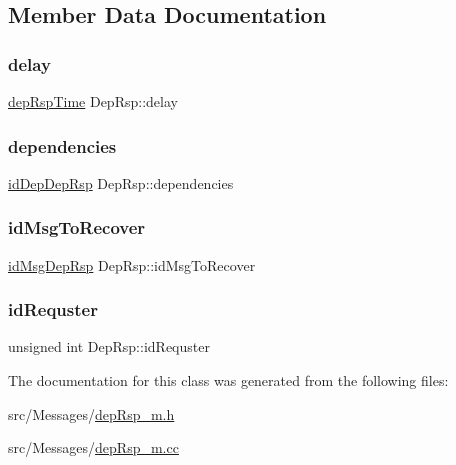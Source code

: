 \subsection{Member Data Documentation}
\mbox{\label{class_dep_rsp_a9b383b175e0b581e1558b2dc34a21b7a}} 
\subsubsection{\texorpdfstring{delay}{delay}}
{\footnotesize\ttfamily \hyperlink{dep_rsp__m_8h_ab118b8474723cf26f98151aae3d55940}{dep\+Rsp\+Time} Dep\+Rsp\+::delay\hspace{0.3cm}{\ttfamily [protected]}}

\mbox{\label{class_dep_rsp_a0881ee52098e202a4486da80efa6ce1f}} 
\subsubsection{\texorpdfstring{dependencies}{dependencies}}
{\footnotesize\ttfamily \hyperlink{dep_rsp__m_8h_a3c2ceb107008eb344443aaab2eb872b8}{id\+Dep\+Dep\+Rsp} Dep\+Rsp\+::dependencies\hspace{0.3cm}{\ttfamily [protected]}}

\mbox{\label{class_dep_rsp_a7b777428e859ba7a6f083e13f6431cf4}} 
\subsubsection{\texorpdfstring{id\+Msg\+To\+Recover}{idMsgToRecover}}
{\footnotesize\ttfamily \hyperlink{dep_rsp__m_8h_a8a41011e0821f196429cd4bc45638bcf}{id\+Msg\+Dep\+Rsp} Dep\+Rsp\+::id\+Msg\+To\+Recover\hspace{0.3cm}{\ttfamily [protected]}}

\mbox{\label{class_dep_rsp_ae8c6f097db47049e4cb84e6788f9d58d}} 
\subsubsection{\texorpdfstring{id\+Requster}{idRequster}}
{\footnotesize\ttfamily unsigned int Dep\+Rsp\+::id\+Requster\hspace{0.3cm}{\ttfamily [protected]}}



The documentation for this class was generated from the following files\+:\begin{DoxyCompactItemize}
\item 
src/\+Messages/\hyperlink{dep_rsp__m_8h}{dep\+Rsp\+\_\+m.\+h}\item 
src/\+Messages/\hyperlink{dep_rsp__m_8cc}{dep\+Rsp\+\_\+m.\+cc}\end{DoxyCompactItemize}

